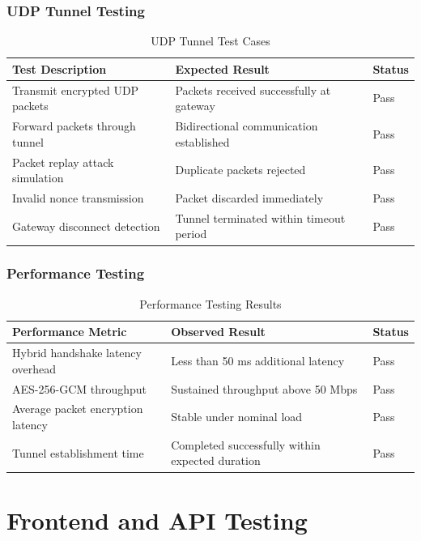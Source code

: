 \subsubsection{UDP Tunnel Testing}

\begin{table}[H]
\centering
\begin{tabularx}{\textwidth}{|X|X|l|}
\hline
\textbf{Test Description} & \textbf{Expected Result} & \textbf{Status} \\ \hline
Transmit encrypted UDP packets & Packets received successfully at gateway & Pass \\ \hline
Forward packets through tunnel & Bidirectional communication established & Pass \\ \hline
Packet replay attack simulation & Duplicate packets rejected & Pass \\ \hline
Invalid nonce transmission & Packet discarded immediately & Pass \\ \hline
Gateway disconnect detection & Tunnel terminated within timeout period & Pass \\ \hline
\end{tabularx}
\caption{UDP Tunnel Test Cases}
\end{table}

\subsubsection{Performance Testing}

\begin{table}[H]
\centering
\begin{tabularx}{\textwidth}{|X|X|l|}
\hline
\textbf{Performance Metric} & \textbf{Observed Result} & \textbf{Status} \\ \hline
Hybrid handshake latency overhead & Less than 50 ms additional latency & Pass \\ \hline
AES-256-GCM throughput & Sustained throughput above 50 Mbps & Pass \\ \hline
Average packet encryption latency & Stable under nominal load & Pass \\ \hline
Tunnel establishment time & Completed successfully within expected duration & Pass \\ \hline
\end{tabularx}
\caption{Performance Testing Results}
\end{table}

\section{Frontend and API Testing}
\label{sec:frontend_testing}


